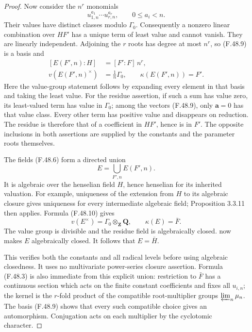 \begin{proof}
Now consider the \(n^r\) monomials
\[
       u_{1,n}^{a_1}\cdots u_{r,n}^{a_r},
                  \qquad 0\leq a_i<n.
 \tag{F.48.9}
\]
Their values have distinct classes modulo \(\Gamma_0\). Consequently a nonzero linear combination over \(HF'\) has a unique term of least value and cannot vanish. They are linearly independent. Adjoining the \(r\) roots has degree at most \(n^r\), so (F.48.9) is a basis and
\[
 \begin{split}
 [E(F',n):H]&=[F':F]\,n^r,\\
 v(E(F',n)^\times)&=\tfrac1n\Gamma_0,\qquad
 \kappa(E(F',n))=F'.
 \end{split}
 \tag{F.48.10}
\]
Here the value-group statement follows by expanding every element in that basis and taking the least value. For the residue assertion, if such a sum has value zero, its least-valued term has value in \(\Gamma_0\); among the vectors (F.48.9), only \(\boldsymbol a=0\) has that value class. Every other term has positive value and disappears on reduction. The residue is therefore that of a coefficient in \(HF'\), hence is in \(F'\). The opposite inclusions in both assertions are supplied by the constants and the parameter roots themselves.

The fields (F.48.6) form a directed union
\[
                       E=\bigcup_{F',n}E(F',n).
 \tag{F.48.11}
\]
It is algebraic over the henselian field \(H\), hence henselian for its inherited valuation. For example, uniqueness of the extension from \(H\) to its algebraic closure gives uniqueness for every intermediate algebraic field; Proposition 3.3.11 then applies. Formula (F.48.10) gives
\[
          v(E^\times)=\Gamma_0\otimes_{\mathbf Z}\mathbf Q,
                        \qquad\kappa(E)=\bar F.
 \tag{F.48.12}
\]
The value group is divisible and the residue field is algebraically closed. \citet[Corollary~3.3.22, author-PDF p.~124]{F_ADH2017} now makes \(E\) algebraically closed. It follows that \(E=\bar H\).

This verifies both the constants and all radical levels before using algebraic closedness. It uses no multivariate power-series closure assertion. Formula (F.48.3) is also immediate from this explicit union: restriction to \(\bar F\) has a continuous section which acts on the finite constant coefficients and fixes all \(u_{i,n}\); the kernel is the \(r\)-fold product of the compatible root-multiplier groups \(\varprojlim_n\mu_n\). The basis (F.48.9) shows that every such compatible choice gives an automorphism. Conjugation acts on each multiplier by the cyclotomic character.


\end{proof}

